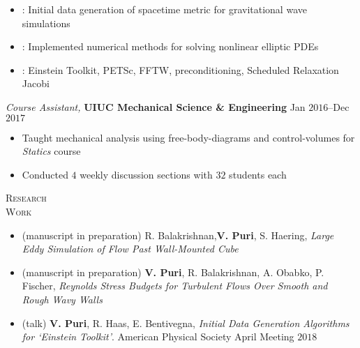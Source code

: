 \documentclass[10pt]{article}
\begin{document}
\begin{multicols}{2}
\vspace{-1.75em}
\begin{itemize}[label=-]
    \setlength\itemsep{-0.25em}
    \setlength{\itemindent}{-1.50em}
    \item {}: Initial data generation of spacetime metric for gravitational wave simulations
    \item {}: Implemented numerical methods for solving nonlinear elliptic PDEs
    \item {}: {Einstein Toolkit}, {PETSc}, {FFTW}, preconditioning, {Scheduled Relaxation Jacobi}
\end{itemize}
\vspace{-2.0em}

\vspace{0.5em}
%
{\sl Course Assistant,} \textbf{UIUC Mechanical Science \& Engineering} \hfill Jan $2016$--Dec $2017$

\vspace{-1.75em}
\begin{itemize}[label=-]
    \setlength\itemsep{-0.25em}
    \setlength{\itemindent}{-1.50em}
    \item Taught mechanical analysis using free-body-diagrams and control-volumes for \textit{Statics} course
    \item Conducted $4$ weekly discussion sections with $32$ students each
\end{itemize}
\vspace{-2.0em}

\end{multicols}
\vspace{-1.5em}
\begin{multicols}{2}
\textsc{Research \\ Work}
\columnbreak

\vspace{-1.75em}
\begin{itemize}[label= ]
    \setlength{\itemindent}{-2.5em}
    \setlength\itemsep{-0.25em}
    \item (manuscript in preparation) R. Balakrishnan,\textbf{V. Puri}, S. Haering, \textit{Large Eddy Simulation of Flow Past Wall-Mounted Cube}
    \item (manuscript in preparation) \textbf{V. Puri}, R. Balakrishnan, A. Obabko, P. Fischer, \textit{Reynolds Stress Budgets for Turbulent Flows Over Smooth and Rough Wavy Walls}
    \item (talk) \textbf{V. Puri}, R. Haas, E. Bentivegna, \textit{Initial Data Generation Algorithms for `Einstein Toolkit'}. American Physical Society April Meeting $2018$
\end{itemize}
\vspace{-2.0em}

\end{multicols}
\end{document}
